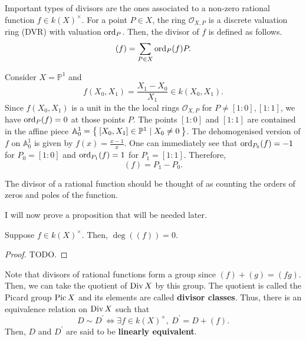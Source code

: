 Important types of divisors are the ones associated to a non-zero rational
function $f\in k(X)^{\times}$. For a point $P\in X$, the ring
$\mathscr{O}_{X,P}$ is a discrete valuation ring (DVR) with valuation
$\operatorname{ord}_{P}$. Then, the divisor of $f$ is defined as follows.
\[
  (f) = \sum_{P\in X}\operatorname{ord}_{P}(f)P.
\]
\begin{ex}
  Consider $X=\mathbb{P}^{1}$ and
  \[f(X_{0}, X_{1})=\frac{X_{1}-X_{0}}{X_{1}}\in k(X_{0}, X_{1}).\]
  Since $f(X_{0}, X_{1})$ is a unit in the the local rings
  $\mathscr{O}_{X,P}$ for $P\neq [1:0], [1:1]$, we have $\operatorname{ord}_{P}(f)=0$
  at those points $P$. The points $[1:0]$ and $[1:1]$ are contained in the
  affine piece $\mathbb{A}_{0}^{1}=\Set{[X_{0},X_{1}]\in\mathbb{P}^{1}\mid
    X_{0}\neq 0}$. The dehomogenised version of $f$ on $\mathbb{A}_{0}^{1}$ is
  given by $f(x)=\frac{x-1}x$. One can immediately see that
  $\operatorname{ord}_{P_{0}}(f)=-1$ for $P_{0}=[1:0]$ and $\operatorname{ord}_{P_{1}}(f)=1$ for
  $P_{1}=[1:1]$. Therefore,
  \[(f)=P_{1}-P_{0}.\]
\end{ex}
\begin{rem}
  The divisor of a rational function should be thought of as counting the
  orders of zeros and poles of the function.
\end{rem}
I will now prove a proposition that will be needed later.
\begin{prop}\label{prop:rational_deg_zero}
  Suppose $f\in k(X)^{\times}$. Then, $\deg\left((f)\right)=0$.
\end{prop}
\begin{proof}
  TODO.
\end{proof}
\begin{rem}
  Note that divisors of rational functions form a group since
  $(f)+(g)=(fg)$. Then, we can take the quotient of $\operatorname{Div} X$ by this group.
  The quotient is called the Picard group $\operatorname{Pic} X$ and its elements are
  called \textbf{divisor classes}. Thus, there is an equivalence relation on
  $\operatorname{Div} X$ such that
  \[
    D\sim D^{\prime}\iff \exists f\in k(X)^{\times},\ D^{\prime}=D+(f).
  \]
  Then, $D$ and $D^{\prime}$ are said to be \textbf{linearly equivalent}.
\end{rem}


